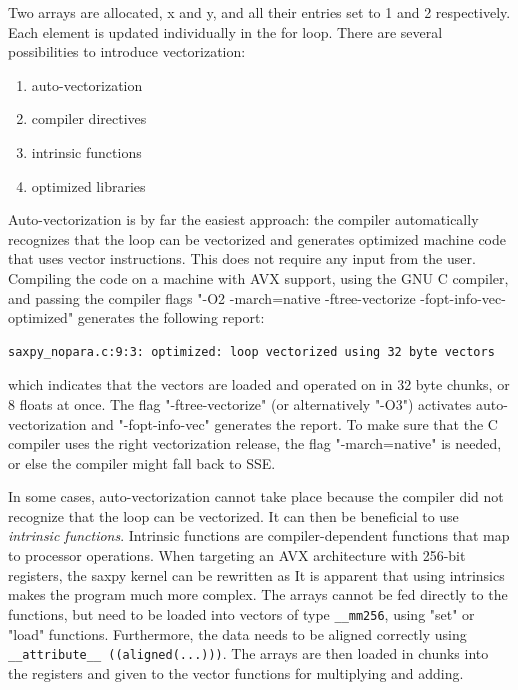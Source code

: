 \noindent Two arrays are allocated, x and y, and all their entries set to 1 and 2 respectively. Each element is updated individually in the for loop. There are several possibilities to introduce vectorization:
\begin{enumerate}
\item auto-vectorization
\item compiler directives
\item intrinsic functions
\item optimized libraries
\end{enumerate}
\noindent Auto-vectorization is by far the easiest approach: the compiler automatically recognizes that the loop can be vectorized and generates optimized machine code that uses vector instructions. This does not require any input from the user. Compiling the code on a machine with AVX support, using the GNU C compiler, and passing the compiler flags "-O2 -march=native -ftree-vectorize -fopt-info-vec-optimized" generates the following report:
\begin{lstlisting}[backgroundcolor=\color{light-gray},breaklines=true]
saxpy_nopara.c:9:3: optimized: loop vectorized using 32 byte vectors
\end{lstlisting}
\noindent which indicates that the vectors are loaded and operated on in 32 byte chunks, or 8 floats at once. The flag "-ftree-vectorize" (or alternatively "-O3") activates auto-vectorization and "-fopt-info-vec" generates the report. To make sure that the C compiler uses the right vectorization release, the flag "-march=native" is needed, or else the compiler might fall back to SSE. 

In some cases, auto-vectorization cannot take place because the compiler did not recognize that the loop can be vectorized. It can then be beneficial to use \emph{intrinsic functions}. Intrinsic functions are compiler-dependent functions that map to processor operations. When targeting an AVX architecture with 256-bit registers, the saxpy kernel can be rewritten as
\noindent It is apparent that using intrinsics makes the program much more complex. The arrays cannot be fed directly to the functions, but need to be loaded into vectors of type \texttt{\_\_mm256}, using "set" or "load" functions. Furthermore, the data needs to be aligned correctly using \texttt{\_\_attribute\_\_ ((aligned(...)))}. The arrays are then loaded in chunks into the registers and given to the vector functions for multiplying and adding. 

